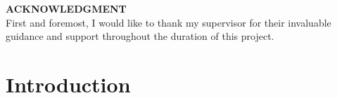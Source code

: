 \documentclass[\myFontSize,a4paper,oneside,english,hidelinks]{article}
\begin{document}
\newpage 			%
\setcounter{page}{4}
\vspace*{\fill} 
\noindent \Large \textbf{ACKNOWLEDGMENT}\\
\noindent First and foremost, I would like to thank my supervisor for their invaluable guidance and support throughout the duration of this project.
\vspace*{\fill} 
\vspace{-8cm} 





\newpage{} 
\setcounter{page}{5}
\renewcommand{\contentsname}{Table of Contents}
\tableofcontents



\newpage{}
\listoffigures
\listoftables
\printglossary[type=\acronymtype, title=List of Abbreviations]










\clearpage{} 
\setcounter{page}{1}

\section{Introduction}
\end{document}
